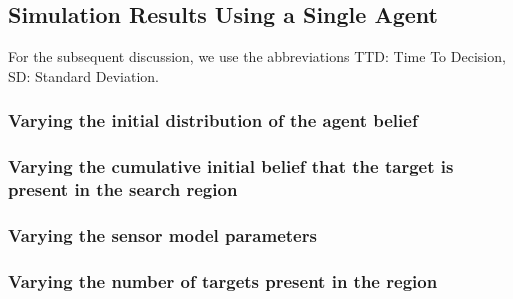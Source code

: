 \subsection{Simulation Results Using a Single Agent}\label{subsec:SingleAgentSingleSourceResults}
For the subsequent discussion, we use the abbreviations TTD: Time To Decision, SD: Standard Deviation.
    
\subsubsection{Varying the initial distribution of the agent belief}\label{subsubsec:VaryingPriorShape}

\break

\subsubsection{Varying the cumulative initial belief that the target is present in the search region}\label{subsubsec:VaryingPriorCumulative}

\break


\subsubsection{Varying the sensor model parameters}\label{subsubsec:MicalibratedSensor}

\break

\subsubsection{Varying the number of targets present in the region}\label{subsubsec:VaryingNoTargets}

%


\break